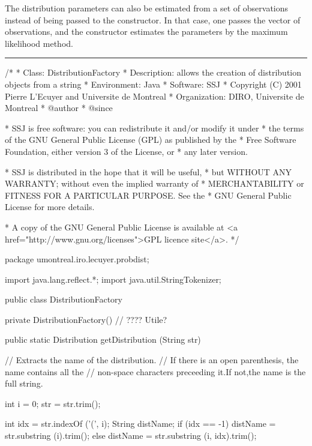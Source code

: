 The distribution parameters can also be estimated from a set of observations
instead of being passed to the constructor.  In that case, one passes the
vector of observations, and the constructor estimates the parameters by
the maximum likelihood method.


\bigskip\hrule

\begin{code}
\begin{hide}
/*
 * Class:        DistributionFactory
 * Description:  allows the creation of distribution objects from a string
 * Environment:  Java
 * Software:     SSJ 
 * Copyright (C) 2001  Pierre L'Ecuyer and Universite de Montreal
 * Organization: DIRO, Universite de Montreal
 * @author       
 * @since

 * SSJ is free software: you can redistribute it and/or modify it under
 * the terms of the GNU General Public License (GPL) as published by the
 * Free Software Foundation, either version 3 of the License, or
 * any later version.

 * SSJ is distributed in the hope that it will be useful,
 * but WITHOUT ANY WARRANTY; without even the implied warranty of
 * MERCHANTABILITY or FITNESS FOR A PARTICULAR PURPOSE.  See the
 * GNU General Public License for more details.

 * A copy of the GNU General Public License is available at
   <a href="http://www.gnu.org/licenses">GPL licence site</a>.
 */
\end{hide}
package umontreal.iro.lecuyer.probdist;
\begin{hide}
import java.lang.reflect.*;
import java.util.StringTokenizer;\end{hide}

public class DistributionFactory\begin{hide} {
   private DistributionFactory() {}   //  ????   Utile?

   public static Distribution getDistribution (String str) {
      // Extracts the name of the distribution.
      // If there is an open parenthesis, the name contains all the 
      // non-space characters preceeding it.If not,the name is the full string.

      int i = 0;
      str = str.trim();

      int idx = str.indexOf ('(', i);
      String distName;
      if (idx == -1)
         distName = str.substring (i).trim();
      else
         distName = str.substring (i, idx).trim();
 
}}
\end{hide}
\end{code}
